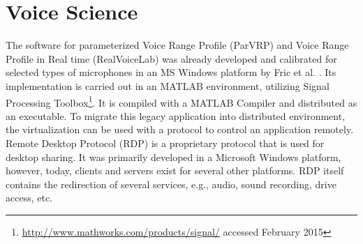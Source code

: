 %
%
\section{Voice Science}
\label{sec:voice}

The software for parameterized Voice Range Profile (ParVRP) and Voice Range Profile in Real time (RealVoiceLab) was already developed and calibrated for selected types of microphones in an MS Windows platform by Fric et al. \cite{Fric2007,Fric2012}. Its implementation is carried out in an MATLAB environment, utilizing Signal Processing Toolbox\footnote{\url{http://www.mathworks.com/products/signal/} accessed February 2015}. It is compiled with a MATLAB Compiler and distributed as an executable. To migrate this legacy application into distributed environment, the virtualization can be used with a protocol to control an application remotely. Remote Desktop Protocol (RDP) is a proprietary protocol that is used for desktop sharing. It was primarily developed in a Microsoft Windows platform, however, today, clients and servers exist for several other platforms. RDP itself contains the redirection of several services, e.g., audio, sound recording, drive access, etc. 

